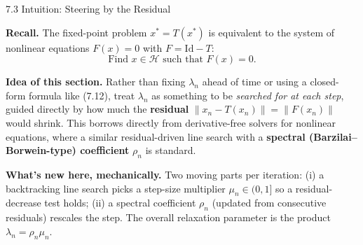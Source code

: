 \documentclass[aspectratio=169,10pt]{beamer}
\newcommand{\mHH}{\mathcal H}
\newcommand{\norm}[1]{\left\|#1\right\|}
\newcommand{\Id}{\mathrm{Id}}
\begin{document}
\begin{frame}{7.3 Intuition: Steering by the Residual}

  \textbf{Recall.} The fixed-point problem $x^*=T(x^*)$ is
  equivalent to the system of nonlinear equations $F(x)=0$ with
  $F=\Id-T$:
  \[
    \text{Find } x\in\mHH \text{ such that } F(x)=0. \tag{7.28}
  \]

  \textbf{Idea of this section.} Rather than fixing $\lambda_n$
  ahead of time or using a closed-form formula like (7.12), treat
  $\lambda_n$ as something to be \emph{searched for at each step},
  guided directly by how much the \textbf{residual}
  $\norm{x_n-T(x_n)}=\norm{F(x_n)}$ would shrink. This borrows
  directly from derivative-free solvers for nonlinear equations,
  where a similar residual-driven line search with a
  \textbf{spectral (Barzilai--Borwein-type) coefficient} $\rho_n$ is
  standard.

  \vspace{0.3em}
  \textbf{What's new here, mechanically.} Two moving parts per
  iteration: (i) a backtracking line search picks a step-size
  multiplier $\mu_n\in(0,1]$ so a residual-decrease test holds; (ii)
  a spectral coefficient $\rho_n$ (updated from consecutive
  residuals) rescales the step. The overall relaxation parameter is
  the product $\lambda_n=\rho_n\mu_n$.

\end{frame}
\end{document}
